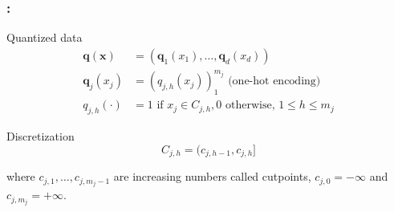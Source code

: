 \documentclass[english,xcolor={rgb,dvipsnames,table,usenames}]{beamer}
\newcommand\q{{\bm{q}}}
\newcommand\s{q}
\newcommand{\bx}{\boldsymbol{x}}
\begin{document}
\begin{frame}[allowframebreaks]
\frametitle{\secname: \subsecname}

%

\begin{block}{Quantized data}
\vspace*{-0.9cm}
\begin{align*}
\q(\bx) & = (\q_1(x_1),\dots,\q_d(x_d)) \\
\q_j(x_j) & = (\s_{j,h}(x_j))_1^{m_j} \text{ (one-hot encoding)} \\
\s_{j,h}(\cdot) & =  1 \text{ if } x_j \in C_{j,h}, 0 \text{ otherwise, } 1 \leq h \leq m_j
\end{align*}
\vspace*{-0.7cm}
\end{block}

\begin{animateinline}{2}%
{\color{red}{\bf Huge cardinality!}}%
\newframe \end{animateinline}

\pagebreak

\begin{block}{Discretization}
\vspace*{-0.4cm}
\[C_{j,h}=(c_{j,h-1},c_{j,h}]\]

where $c_{j,1},\ldots,c_{j,m_j-1}$ are increasing numbers called cutpoints, $c_{j,0}=-\infty$ and $c_{j,m_j}=+\infty$.
\end{block}

\bigskip

\begin{center}
\end{center}
\end{frame}
\end{document}
